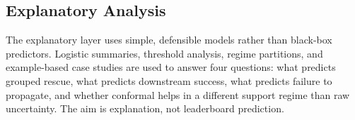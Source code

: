 \subsection{Explanatory Analysis}

The explanatory layer uses simple, defensible models rather than black-box predictors. Logistic summaries, threshold analysis, regime partitions, and example-based case studies are used to answer four questions: what predicts grouped rescue, what predicts downstream success, what predicts failure to propagate, and whether conformal helps in a different support regime than raw uncertainty. The aim is explanation, not leaderboard prediction.
